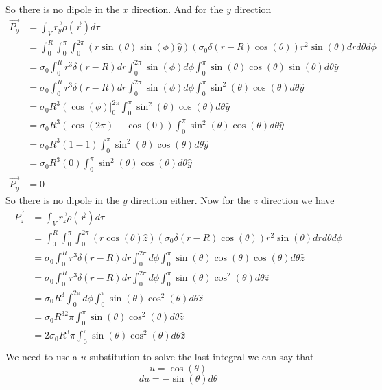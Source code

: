 \documentclass[11pt]{article}
\numberwithin{equation}{section}
\begin{document}
\begin{enumerate}[(i)]
So there is no dipole in the $x$ direction. And for the $y$ direction 
\begin{align*}
\vec{P_y} &= \int_V\vec{r_y}\rho(\vec{r})d\tau\\
 &= \int_0^R\int_0^{\pi}\int_0^{2\pi}(r\sin(\theta)\sin(\phi)\hat{y})(\sigma_0\delta(r-R)\cos(\theta))r^2\sin(\theta)drd\theta d\phi\\
 &= \sigma_0\int_0^Rr^3\delta(r-R)dr\int_0^{2\pi}\sin(\phi) d\phi\int_0^{\pi}\sin(\theta)\cos(\theta)\sin(\theta)d\theta\hat{y}\\
 &= \sigma_0\int_0^Rr^3\delta(r-R)dr\int_0^{2\pi}\sin(\phi) d\phi\int_0^{\pi}\sin^2(\theta)\cos(\theta)d\theta\hat{y}\\
 &= \sigma_0R^3\left(\cos(\phi)\right|_0^{2\pi}\int_0^{\pi}\sin^2(\theta)\cos(\theta)d\theta\hat{y}\\
 &= \sigma_0R^3\left(\cos(2\pi)-\cos(0)\right)\int_0^{\pi}\sin^2(\theta)\cos(\theta)d\theta\hat{y}\\
 &= \sigma_0R^3\left(1-1\right)\int_0^{\pi}\sin^2(\theta)\cos(\theta)d\theta\hat{y}\\
 &= \sigma_0R^3\left(0\right)\int_0^{\pi}\sin^2(\theta)\cos(\theta)d\theta\hat{y}\\
\vec{P_y}&=0
\end{align*}
So there is no dipole in the $y$ direction either. Now for the $z$ direction we have
\begin{align*}
\vec{P_z} &= \int_V\vec{r_z}\rho(\vec{r})d\tau\\
 &= \int_0^R\int_0^{\pi}\int_0^{2\pi}(r\cos(\theta)\hat{z})(\sigma_0\delta(r-R)\cos(\theta))r^2\sin(\theta)drd\theta d\phi\\
 &= \sigma_0\int_0^Rr^3\delta(r-R)dr\int_0^{2\pi} d\phi\int_0^{\pi}\sin(\theta)\cos(\theta)\cos(\theta)d\theta\hat{z}\\
 &= \sigma_0\int_0^Rr^3\delta(r-R)dr\int_0^{2\pi} d\phi\int_0^{\pi}\sin(\theta)\cos^2(\theta)d\theta\hat{z}\\
 &= \sigma_0R^3\int_0^{2\pi} d\phi\int_0^{\pi}\sin(\theta)\cos^2(\theta)d\theta\hat{z}\\
 &= \sigma_0R^32\pi \int_0^{\pi}\sin(\theta)\cos^2(\theta)d\theta\hat{z}\\
 &= 2\sigma_0R^3\pi \int_0^{\pi}\sin(\theta)\cos^2(\theta)d\theta\hat{z}\\
\end{align*}
We need to use a $u$ substitution to solve the last integral we can say that 
$$u=\cos(\theta)$$
$$du=-\sin(\theta)d\theta$$


\end{enumerate}
\end{document}
